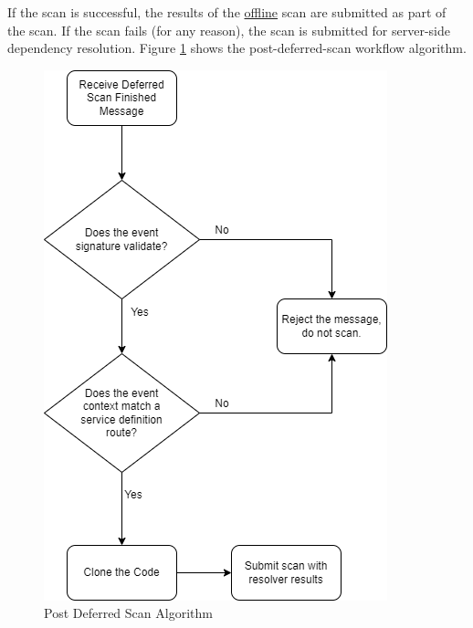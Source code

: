 If the \scaresolver scan is successful, the results of the 
\href{https://docs.checkmarx.com/en/34965-19199-running-scans-using-checkmarx-sca-resolver.html#UUID-af718204-6dfc-2b27-439e-419b9157d364_id_RunningScansUsingCheckmarxSCAResolver-CheckmarxSCAResolverModes}{offline}
scan are submitted as part of the \cxone scan.  If the \scaresolver scan fails (for any reason), the \cxone scan is submitted for server-side dependency resolution.
Figure \ref{fig:post-deferred-scan-flowchart} shows the post-deferred-scan workflow algorithm.

\begin{figure}[ht]
  \includegraphics[width=\textwidth]{graphics/cxoneflow-diagrams-Post Deferred Scan Algorithm.png}
  \caption{Post Deferred Scan Algorithm}
  \label{fig:post-deferred-scan-flowchart}
\end{figure}



